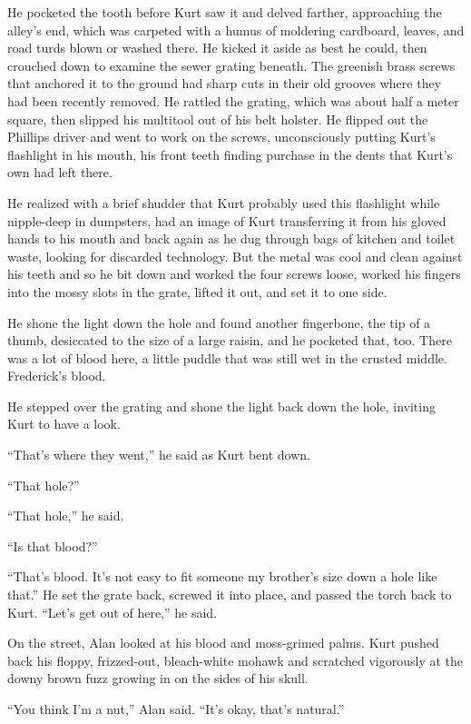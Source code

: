 \documentclass{article}
\begin{document}
He pocketed the tooth before Kurt saw it and delved farther,
approaching the alley's end, which was carpeted with a humus of
moldering cardboard, leaves, and road turds blown or washed there.  He
kicked it aside as best he could, then crouched down to examine the
sewer grating beneath.  The greenish brass screws that anchored it to
the ground had sharp cuts in their old grooves where they had been
recently removed.  He rattled the grating, which was about half a
meter square, then slipped his multitool out of his belt holster.  He
flipped out the Phillips driver and went to work on the screws,
unconsciously putting Kurt's flashlight in his mouth, his front teeth
finding purchase in the dents that Kurt's own had left there.

He realized with a brief shudder that Kurt probably used this
flashlight while nipple-deep in dumpsters, had an image of Kurt
transferring it from his gloved hands to his mouth and back again as
he dug through bags of kitchen and toilet waste, looking for discarded
technology.  But the metal was cool and clean against his teeth and so
he bit down and worked the four screws loose, worked his fingers into
the mossy slots in the grate, lifted it out, and set it to one side.

He shone the light down the hole and found another fingerbone, the tip
of a thumb, desiccated to the size of a large raisin, and he pocketed
that, too.  There was a lot of blood here, a little puddle that was
still wet in the crusted middle.  Frederick's blood.

He stepped over the grating and shone the light back down the hole,
inviting Kurt to have a look.

``That's where they went,'' he said as Kurt bent down.

``That hole?''

``That hole,'' he said.

``Is that blood?''

``That's blood.  It's not easy to fit someone my brother's size down a
hole like that.'' He set the grate back, screwed it into place, and
passed the torch back to Kurt.  ``Let's get out of here,'' he said.

On the street, Alan looked at his blood and moss-grimed palms.  Kurt
pushed back his floppy, frizzed-out, bleach-white mohawk and scratched
vigorously at the downy brown fuzz growing in on the sides of his
skull.

``You think I'm a nut,'' Alan said.  ``It's okay, that's natural.''
\end{document}
